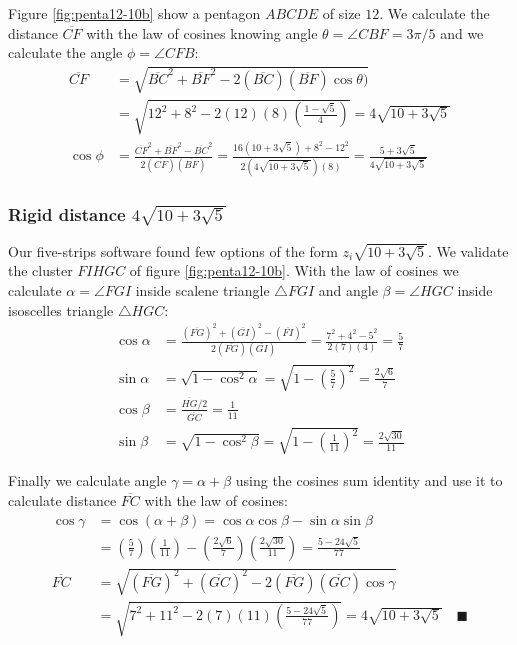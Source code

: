 \documentclass[11pt]{article}
\begin{document}
Figure \ref{fig:penta12-10b} show a pentagon $ABCDE$ of size $12$. We calculate the distance $\overline{CF}$ with the law of cosines knowing angle $\theta = \angle{CBF} = 3\pi / 5$ and we calculate the angle $\phi = \angle{CFB}$:
\begin{align}
\overline{CF} &= \sqrt{\overline{BC}^2 + \overline{BF}^2 
 - 2(\overline{BC})(\overline{BF})\cos\theta)} \nonumber\\
 &= \sqrt{12^2 + 8^2 - 2(12)(8)\left(\frac{1-\sqrt5}4\right)}
 = 4\sqrt{10 + 3\sqrt5} \\
%
\cos\phi &= \frac{\overline{CF}^2 + \overline{BF}^2 - \overline{BC}^2}
 {2(\overline{CF})(\overline{BF})}%
 = \frac{16(10 + 3\sqrt5) + 8^2 - 12^2}{2(4\sqrt{10 + 3\sqrt5})(8)}
  = \frac{5 + 3\sqrt5}{4\sqrt{10 + 3\sqrt5}}
\end{align}

\subsubsection{Rigid distance $4\sqrt{10 + 3\sqrt5}$}

Our five-strips software found few options of the form $z_i\sqrt{10+3\sqrt5}$. We validate the cluster $FIHGC$ of figure \ref{fig:penta12-10b}. With the law of cosines we calculate $\alpha = \angle{FGI}$ inside scalene triangle $\triangle{FGI}$ and angle $\beta = \angle{HGC}$ inside isoscelles triangle $\triangle{HGC}$:
\begin{align}
\cos\alpha &= \frac{(\overline{FG})^2 + (\overline{GI})^2 - (\overline{FI})^2}
 {2(\overline{FG})(\overline{GI})}
 = \frac{7^2 + 4^2 - 5^2}{2(7)(4)} = \frac{5}7 \\
\sin\alpha &= \sqrt{1 - \cos^2\alpha} 
 = \sqrt{1 - \left(\frac{5}7\right)^2} = \frac{2\sqrt6}7 \\
\cos\beta &= \frac{\overline{HG}/2}{\overline{GC}} = \frac{1}{11} \\
\sin\beta &= \sqrt{1 - \cos^2\beta}
 = \sqrt{1 - \left(\frac{1}{11}\right)^2} = \frac{2\sqrt{30}}{11}
\end{align}

Finally we calculate angle $\gamma = \alpha + \beta$ using the cosines sum identity and use it to calculate distance $\overline{FC}$ with the law of cosines:
\begin{align}
\cos\gamma &= \cos(\alpha + \beta) = \cos\alpha\cos\beta - \sin\alpha\sin\beta \nonumber\\
 &= \left(\frac{5}7\right)\left(\frac{1}{11}\right) 
  - \left(\frac{2\sqrt6}7\right)\left(\frac{2\sqrt{30}}{11}\right)
  = \frac{5 - 24\sqrt5}{77} \\
%
\overline{FC} &= \sqrt{(\overline{FG})^2 + (\overline{GC})^2 
 - 2(\overline{FG})(\overline{GC})\cos\gamma} \nonumber\\
  &= \sqrt{7^2 + 11^2 - 2(7)(11)\left(\frac{5 - 24\sqrt5}{77}\right)} 
  = 4\sqrt{10 + 3\sqrt5} \quad \blacksquare
\end{align}
\end{document}
